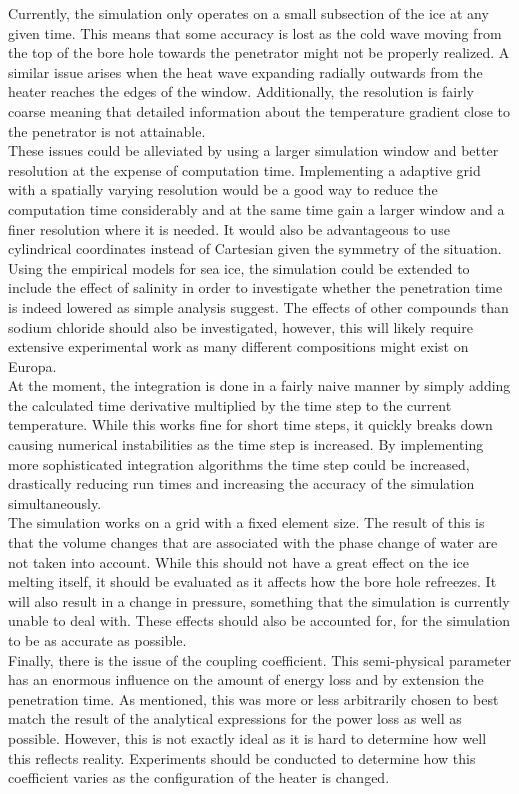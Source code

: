 \noindent
Currently, the simulation only operates on a small subsection of the ice at any given time. This means that some accuracy is lost as the cold wave moving from the top of the bore hole towards the penetrator might not be properly realized. A similar issue arises when the heat wave expanding radially outwards from the heater reaches the edges of the window. Additionally, the resolution is fairly coarse meaning that detailed information about the temperature gradient close to the penetrator is not attainable.\\
These issues could be alleviated by using a larger simulation window and better resolution at the expense of computation time. Implementing a adaptive grid with a spatially varying resolution would be a good way to reduce the computation time considerably and at the same time gain a larger window and a finer resolution where it is needed. It would also be advantageous to use cylindrical coordinates instead of Cartesian given the symmetry of the situation.\\

\noindent
Using the empirical models for sea ice, the simulation could be extended to include the effect of salinity in order to investigate whether the penetration time is indeed lowered as simple analysis suggest. The effects of other compounds than sodium chloride should also be investigated, however, this will likely require extensive experimental work as many different compositions might exist on Europa.\\

\noindent
At the moment, the integration is done in a fairly naive manner by simply adding the calculated time derivative multiplied by the time step to the current temperature. While this works fine for short time steps, it quickly breaks down causing numerical instabilities as the time step is increased. By implementing more sophisticated integration algorithms the time step could be increased, drastically reducing run times and increasing the accuracy of the simulation simultaneously.\\

\noindent
The simulation works on a grid with a fixed element size. The result of this is that the volume changes that are associated with the phase change of water are not taken into account. While this should not have a great effect on the ice melting itself, it should be evaluated as it affects how the bore hole refreezes. It will also result in a change in pressure, something that the simulation is currently unable to deal with. These effects should also be accounted for, for the simulation to be as accurate as possible.\\

\noindent
Finally, there is the issue of the coupling coefficient. This semi-physical parameter has an enormous influence on the amount of energy loss and by extension the penetration time. As mentioned, this was more or less arbitrarily chosen to best match the result of the analytical expressions for the power loss as well as possible. However, this is not exactly ideal as it is hard to determine how well this reflects reality. Experiments should be conducted to determine how this coefficient varies as the configuration of the heater is changed.     


